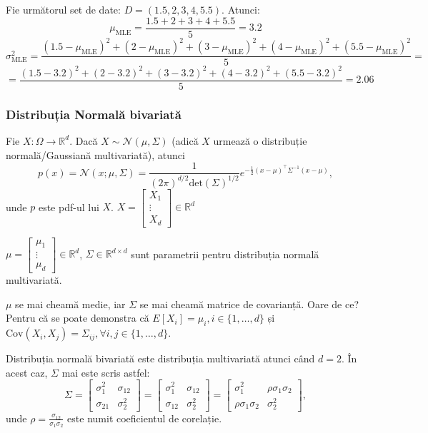 \documentclass[12pt]{article}
\begin{document}
	Fie următorul set de date: $D = (1.5,2,3,4,5.5)$. Atunci:
	$$\mu_\text{MLE} = \frac{1.5 + 2 + 3 + 4 +5.5}{5} = 3.2$$
	$$\sigma^2_\text{MLE} = \frac{(1.5 - \mu_\text{MLE})^2 + (2 - \mu_\text{MLE})^2 + (3 - \mu_\text{MLE})^2 + (4 - \mu_\text{MLE})^2 + (5.5 - \mu_\text{MLE})^2}{5} =$$
	$$= \frac{(1.5 - 3.2)^2 + (2 - 3.2)^2 + (3 - 3.2)^2 + (4 - 3.2)^2 + (5.5 - 3.2)^2}{5} = 2.06$$
	
	\subsubsection{Distribuția Normală bivariată}
	Fie $X : \Omega \rightarrow \mathbb{R}^d$. Dacă $X \sim \mathcal{N}(\mu,\Sigma)$ (adică $X$ urmează o distribuție normală/Gaussiană multivariată), atunci $$p(x) = \mathcal{N}(x;\mu,\Sigma) = \frac{1}{(2\pi)^{d/2} \text{det}(\Sigma)^{1/2}} e^{-\frac{1}{2} (x - \mu)^\top \Sigma^{-1} (x - \mu)},$$
	unde $p$ este pdf-ul lui $X$. $X = \begin{bmatrix}
	X_1\\
	\vdots\\
	X_d
	\end{bmatrix} \in \mathbb{R}^{d}$
	
	$\mu =\begin{bmatrix}
	\mu_1\\
	\vdots\\
	\mu_d
	\end{bmatrix} \in \mathbb{R}^{d}$, $\Sigma \in \mathbb{R}^{d \times d}$ sunt parametrii pentru distribuția normală multivariată.
	
	$\mu$ se mai cheamă medie, iar $\Sigma$ se mai cheamă matrice de covarianță. Oare de ce? Pentru că se poate demonstra că $E[X_i] = \mu_i, i\in \{1,\dots,d\}$ și $\text{Cov}(X_i,X_j) = \Sigma_{ij}, \forall i,j \in \{1,\dots,d\}$.
	
	Distribuția normală bivariată este distribuția multivariată atunci când $d = 2$. În acest caz, $\Sigma$ mai este scris astfel:
	$$\Sigma = \begin{bmatrix}
	\sigma_{1}^2 & \sigma_{12}\\
	\sigma_{21} & \sigma_2^2
	\end{bmatrix} = \begin{bmatrix}
	\sigma_{1}^2 & \sigma_{12}\\
	\sigma_{12} & \sigma_2^2
	\end{bmatrix} = \begin{bmatrix}
	\sigma_{1}^2 & \rho \sigma_{1} \sigma_2\\
	\rho \sigma_1 \sigma_2 & \sigma_2^2
	\end{bmatrix},$$
	unde $\rho = \frac{\sigma_{12}}{\sigma_1 \sigma_2}$ este numit coeficientul de corelație.
	
\end{document}
